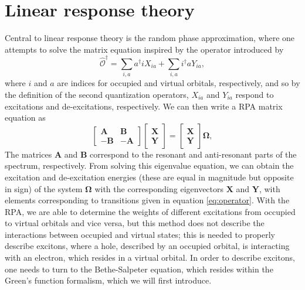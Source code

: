 \documentclass[12pt]{article}
\begin{document}
\section{Linear response theory}
Central to linear response theory is the random phase approximation, where one attempts to solve the matrix equation inspired by the operator introduced by \textcite{casida_progress_2012}
\begin{equation}
\hat{\mathcal{O}}^{\dagger}=\sum_{i, a} a^{\dagger} i X_{i a}+\sum_{i, a} i^{\dagger} a Y_{i a},
\label{eq: operator}
\end{equation}
where $i$ and $a$ are indices for occupied and virtual orbitals, respectively, and so by the definition of the second quantization operators, $X_{ia}$ and $Y_{ia}$ respond to excitations and de-excitations, respectively. We can then write a RPA matrix equation as \autocite{dreuw_single-reference_2005}
\begin{equation}
\begin{bmatrix}
\textbf{A} & \textbf{B} \\
-\textbf{B} & -\textbf{A}
\end{bmatrix}
\begin{bmatrix}
\textbf{X} \\
\textbf{Y}
\end{bmatrix}
=
\begin{bmatrix}
\textbf{X} \\
\textbf{Y}
\end{bmatrix}
\boldsymbol{\Omega }
,
\label{eq: RPA matrix equation}
\end{equation}
The matrices $\textbf{A}$ and $\textbf{B}$ correspond to the resonant and anti-resonant parts of the spectrum, respectively. From solving this eigenvalue equation, we can obtain the excitation and de-excitation energies (these are equal in magnitude but opposite in sign) of the system $\boldsymbol{\Omega}$ with the corresponding eigenvectors $\textbf{X}$ and $\textbf{Y}$, with elements corresponding to transitions given in equation \ref{eq:operator}. With the RPA, we are able to determine the weights of different excitations from occupied to virtual orbitals and vice versa, but this method does not describe the interactions between occupied and virtual states; this is needed to properly describe excitons, where a hole, described by an occupied orbital, is interacting with an electron, which resides in a virtual orbital\autocite{reining_10_nodate}. In order to describe excitons, one needs to turn to the Bethe-Salpeter equation, which resides within the Green's function formalism, which we will first introduce.
\end{document}
